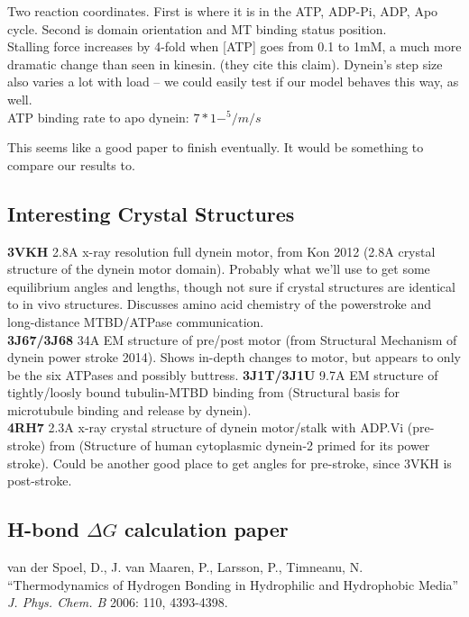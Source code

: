 \documentclass[10pt]{article} %
\begin{document}
Two reaction coordinates. First is where it is in the ATP, ADP-Pi, ADP, Apo cycle. Second is domain orientation and MT binding status position.\\

Stalling force increases by 4-fold when [ATP] goes from 0.1 to 1mM, a much more dramatic change than seen in kinesin. (they cite this claim). Dynein's step size also varies a lot with load -- we could easily test if our model behaves this way, as well.\\

ATP binding rate to apo dynein: $7*1-^5/m/s$

This seems like a good paper to finish eventually. It would be something to compare our results to.\\

\subsection{Interesting Crystal Structures}
\textbf{3VKH} 2.8A x-ray resolution full dynein motor, from Kon 2012 (2.8A crystal structure of the dynein motor domain). Probably what we'll use to get some equilibrium angles and lengths, though not sure if crystal structures are identical to in vivo structures. Discusses amino acid chemistry of the powerstroke and long-distance MTBD/ATPase communication.\\
\textbf{3J67/3J68} 34A EM structure of pre/post motor (from Structural Mechanism of dynein power stroke 2014). Shows in-depth changes to motor, but appears to only be the six ATPases and possibly buttress.
\textbf{3J1T/3J1U} 9.7A EM structure of tightly/loosly bound tubulin-MTBD binding from (Structural basis for microtubule binding and release by dynein).\\
\textbf{4RH7} 2.3A x-ray crystal structure of dynein motor/stalk with ADP.Vi (pre-stroke) from (Structure of human cytoplasmic dynein-2 primed for its power stroke). Could be another good place to get angles for pre-stroke, since 3VKH is post-stroke.\\

\subsection{H-bond $\Delta G$ calculation paper}
van der Spoel, D., J. van Maaren, P., Larsson, P., Timneanu, N. ``Thermodynamics of Hydrogen Bonding in Hydrophilic and Hydrophobic Media'' \textit{J. Phys. Chem. B} 2006: 110, 4393-4398.\\
\end{document}

